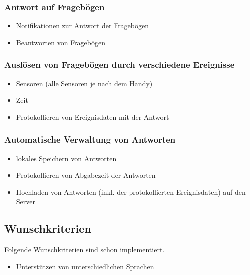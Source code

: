 \documentclass[a4paper]{scrreprt}
\begin{document}
                \subsubsection{Antwort auf Frageb\"ogen}
                    \begin{itemize}
                        \item Notifikationen zur Antwort der Frageb\"ogen
                        \item Beantworten von Frageb\"ogen
                    \end{itemize}
                \subsubsection{Auslösen von Frageb\"ogen durch verschiedene Ereignisse}
                    \begin{itemize}
                        \item Sensoren (alle Sensoren je nach dem Handy)
                        \item Zeit
                        \item Protokollieren von Ereignisdaten mit der Antwort
                    \end{itemize}
                \subsubsection{Automatische Verwaltung von Antworten}
                    \begin{itemize}
                        \item lokales Speichern von Antworten
                        \item Protokollieren von Abgabezeit der Antworten
                        \item Hochladen von Antworten (inkl. der protokollierten Ereignisdaten) auf den Server
                    \end{itemize}
                \vspace*{0.5cm}
        \subsection{Wunschkriterien}
        \par
        Folgende Wunschkriterien sind schon implementiert. 
                \begin{itemize}
                    \item Unterst\"utzen von unterschiedlichen Sprachen
                \end{itemize}
                \vspace*{0.5cm}
                
\end{document}
